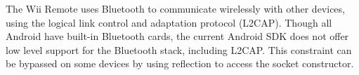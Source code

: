 \documentclass[11pt,twoside,a4paper]{report}
\begin{document}
The Wii Remote uses Bluetooth to communicate wirelessly with other devices, using the logical link control and adaptation protocol (L2CAP). Though all Android have built-in Bluetooth cards, the current Android SDK does not offer low level support for the Bluetooth stack, including L2CAP. This constraint can be bypassed on some devices by using reflection to access the socket constructor. %



\end{document}
